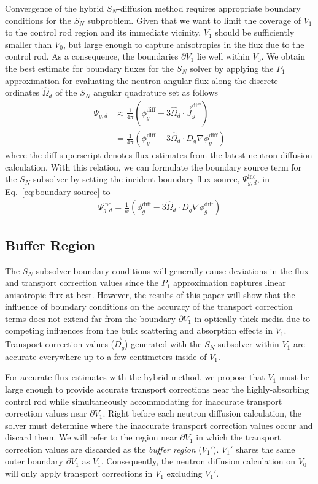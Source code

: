 Convergence of the hybrid $S_N$-diffusion method requires appropriate boundary conditions for
the $S_N$ subproblem.
Given that we want to limit the coverage of $V_1$ to the control rod region and its
immediate vicinity, $V_1$ should be sufficiently smaller than $V_0$, but large enough to capture
anisotropies in the flux due to the control rod. As a consequence, the boundaries $\partial V_1$ 
lie well within $V_0$. We obtain the best estimate for boundary fluxes for the $S_N$ solver by
applying the $P_1$ approximation for evaluating the neutron angular flux along
the discrete ordinates $\hat{\Omega}_d$ of the $S_N$ angular quadrature set as follows
%
\begin{align}
  \Psi_{g,d} &\approx \frac{1}{4\pi}\left(\phi^\text{diff}_g+3\hat{\Omega}_d\cdot
  \vec{J}^\text{diff}_g\right) \nonumber \\
  &=\frac{1}{4\pi}\left(\phi^\text{diff}_g-3\hat{\Omega}_d\cdot D_g\nabla\phi^\text{diff}_g\right)
\end{align}
%
where the diff superscript denotes flux estimates from the latest neutron diffusion calculation.
With this relation, we can formulate the boundary source term for the $S_N$ subsolver by setting
the incident boundary flux source,
$\Psi^\text{inc}_{g,d}$, in Eq.\ \ref{eq:boundary-source} to
%
\begin{gather}
  \Psi^\text{inc}_{g,d} = \frac{1}{w}
  \left(\phi^\text{diff}_g-3\hat{\Omega}_d\cdot D_g\nabla\phi^\text{diff}_g\right)
\end{gather}

\subsection{Buffer Region} \label{sec:buffer-region}

The $S_N$ subsolver boundary conditions will generally cause deviations
in the flux and transport correction values since the $P_1$ approximation captures
linear anisotropic flux at best. However, the results of this paper will show that
the influence of boundary conditions on the accuracy of
the transport correction terms does not extend far from the boundary $\partial V_1$ in optically
thick media due to competing influences from the bulk scattering and absorption effects in $V_1$.
Transport correction values ($\vec{D}_g$) generated with the $S_N$ subsolver within $V_1$ are
accurate everywhere up to a few centimeters inside of $V_1$.

For accurate flux estimates with the hybrid method, we propose that $V_1$ must be large enough to
provide accurate transport corrections near the highly-absorbing control rod while simultaneously
accommodating for inaccurate transport correction values near $\partial V_1$. Right before each
neutron diffusion calculation, the solver must determine where the inaccurate transport correction
values occur and discard them. We will refer to the region near $\partial V_1$ in which the
transport correction values are discarded as the \textit{buffer region} ($V_1'$).
$V_1'$ shares the same outer boundary $\partial V_1$ as $V_1$. Consequently, the neutron
diffusion calculation on $V_0$ will only apply transport corrections in $V_1$ excluding $V_1'$.

